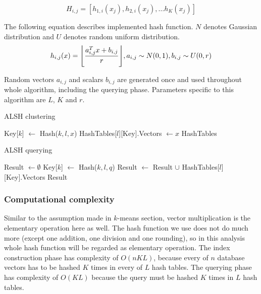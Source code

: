 $$H_{i,j} = [h_{1,i}(x_j), h_{2,i}(x_j), \dots h_K(x_j)]$$

The following equation describes implemented hash function.
$N$ denotes Gaussian distribution and $U$ denotes random uniform distribution.
\begin{equation*}
h_{i,j}(x) = \floor*{\frac{a_{i,j}^T x + b_{i,j}}{r}}, a_{i,j} \sim N(0,1), b_{i,j} \sim U(0,r)
\end{equation*}
\par
Random vectors $a_{i,j}$ and scalars $b_{i,j}$ are generated once and used throughout whole
algorithm, including the querying phase. Parameters specific to this algorithm are $L$, $K$ and $r$.

\begin{algorithm}
	\caption{ALSH clustering}
	\begin{algorithmic}
				\State Key[$k$] $\gets$ Hash($k, l, x$)
			\EndFor
			\State HashTables[$l$][Key].Vectors $\gets x$
		\EndFor
		\State \Return HashTables
	\end{algorithmic}
\end{algorithm}

\begin{algorithm}
	\caption{ALSH querying}
	\begin{algorithmic}
		\State Result $\gets \emptyset$
		\For{$l = 0, 1, ..., L$}
			\For{$k = 0, 1, ..., K$}
				\State Key[$k$] $\gets$ Hash($k, l, q$)
			\EndFor
			\State Result $\gets$ Result $\cup$ HashTables[$l$][Key].Vectors
		\EndFor
		\State \Return Result
	\end{algorithmic}
\end{algorithm}

\subsubsection*{Computational complexity}
Similar to the assumption made in $k$-means section, vector multiplication is the elementary operation here as well.
The hash function we use does not do much more (except one addition, one division and one rounding),
so in this analysis whole hash function will be regarded as elementary operation.
The index construction phase has complexity of $O(nKL)$, because every of $n$ database vectors
has to be hashed $K$ times in every of $L$ hash tables.
The querying phase has complexity of $O(KL)$ because the query must be hashed $K$ times in $L$ hash tables.


